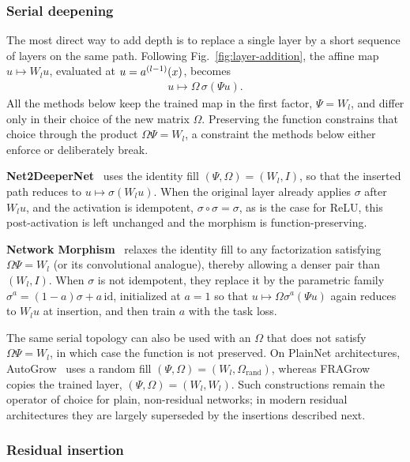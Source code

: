 \subsubsection{Serial deepening}

The most direct way to add depth is to replace a single layer by a short sequence of layers on the same path. Following Fig.~\ref{fig:layer-addition}, the affine map $u\mapsto W_lu$, evaluated at $u=\postact[l-1](x)$, becomes
\begin{align}
u\mapsto \Omega\,\sigma(\Psi u).
\end{align}
All the methods below keep the trained map in the first factor, $\Psi=W_l$, and differ only in their choice of the new matrix $\Omega$. Preserving the function constrains that choice through the product $\Omega\Psi=W_l$, a constraint the methods below either enforce or deliberately break.

\textbf{Net2DeeperNet}~\citep{chen_net2net_2016} uses the identity fill $(\Psi,\Omega)=(W_l,I)$, so that the inserted path reduces to $u\mapsto\sigma(W_lu)$. When the original layer already applies $\sigma$ after $W_lu$, and the activation is idempotent, $\sigma\circ\sigma=\sigma$, as is the case for ReLU, this post-activation is left unchanged and the morphism is function-preserving.

\textbf{Network Morphism}~\citep{wei_network_2016} relaxes the identity fill to any factorization satisfying $\Omega\Psi=W_l$ (or its convolutional analogue), thereby allowing a denser pair than $(W_l,I)$. When $\sigma$ is not idempotent, they replace it by the parametric family $\sigma^a=(1-a)\sigma+a\,\mathrm{id}$, initialized at $a=1$ so that $u\mapsto\Omega\sigma^a(\Psi u)$ again reduces to $W_lu$ at insertion, and then train $a$ with the task loss.

The same serial topology can also be used with an $\Omega$ that does not satisfy $\Omega\Psi=W_l$, in which case the function is not preserved. On PlainNet architectures, AutoGrow~\citep{wen_autogrow_2020} uses a random fill $(\Psi,\Omega)=(W_l,\Omega_{\mathrm{rand}})$, whereas FRAGrow~\citep{wu_when_2024} copies the trained layer, $(\Psi,\Omega)=(W_l,W_l)$. Such constructions remain the operator of choice for plain, non-residual networks; in modern residual architectures they are largely superseded by the insertions described next.

\subsubsection{Residual insertion}

